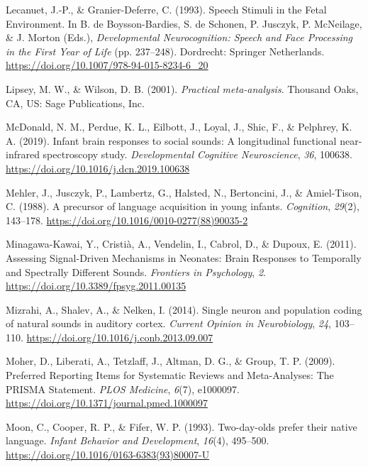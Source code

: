 \documentclass[
  english,
  man]{apa6}
\begin{document}
\leavevmode\hypertarget{ref-lecanuet_speech_1993}{}%
Lecanuet, J.-P., \& Granier-Deferre, C. (1993). Speech Stimuli in the Fetal Environment. In B. de Boysson-Bardies, S. de Schonen, P. Jusczyk, P. McNeilage, \& J. Morton (Eds.), \emph{Developmental Neurocognition: Speech and Face Processing in the First Year of Life} (pp. 237--248). Dordrecht: Springer Netherlands. \url{https://doi.org/10.1007/978-94-015-8234-6_20}

\leavevmode\hypertarget{ref-lipsey_practical_2001}{}%
Lipsey, M. W., \& Wilson, D. B. (2001). \emph{Practical meta-analysis}. Thousand Oaks, CA, US: Sage Publications, Inc.

\leavevmode\hypertarget{ref-mcdonald_infant_2019}{}%
McDonald, N. M., Perdue, K. L., Eilbott, J., Loyal, J., Shic, F., \& Pelphrey, K. A. (2019). Infant brain responses to social sounds: A longitudinal functional near-infrared spectroscopy study. \emph{Developmental Cognitive Neuroscience}, \emph{36}, 100638. \url{https://doi.org/10.1016/j.dcn.2019.100638}

\leavevmode\hypertarget{ref-mehler_precursor_1988}{}%
Mehler, J., Jusczyk, P., Lambertz, G., Halsted, N., Bertoncini, J., \& Amiel-Tison, C. (1988). A precursor of language acquisition in young infants. \emph{Cognition}, \emph{29}(2), 143--178. \url{https://doi.org/10.1016/0010-0277(88)90035-2}

\leavevmode\hypertarget{ref-minagawa-kawai_assessing_2011}{}%
Minagawa-Kawai, Y., Cristià, A., Vendelin, I., Cabrol, D., \& Dupoux, E. (2011). Assessing Signal-Driven Mechanisms in Neonates: Brain Responses to Temporally and Spectrally Different Sounds. \emph{Frontiers in Psychology}, \emph{2}. \url{https://doi.org/10.3389/fpsyg.2011.00135}

\leavevmode\hypertarget{ref-mizrahi_single_2014}{}%
Mizrahi, A., Shalev, A., \& Nelken, I. (2014). Single neuron and population coding of natural sounds in auditory cortex. \emph{Current Opinion in Neurobiology}, \emph{24}, 103--110. \url{https://doi.org/10.1016/j.conb.2013.09.007}

\leavevmode\hypertarget{ref-moher_preferred_2009}{}%
Moher, D., Liberati, A., Tetzlaff, J., Altman, D. G., \& Group, T. P. (2009). Preferred Reporting Items for Systematic Reviews and Meta-Analyses: The PRISMA Statement. \emph{PLOS Medicine}, \emph{6}(7), e1000097. \url{https://doi.org/10.1371/journal.pmed.1000097}

\leavevmode\hypertarget{ref-moon_two-day-olds_1993}{}%
Moon, C., Cooper, R. P., \& Fifer, W. P. (1993). Two-day-olds prefer their native language. \emph{Infant Behavior and Development}, \emph{16}(4), 495--500. \url{https://doi.org/10.1016/0163-6383(93)80007-U}
\end{document}
